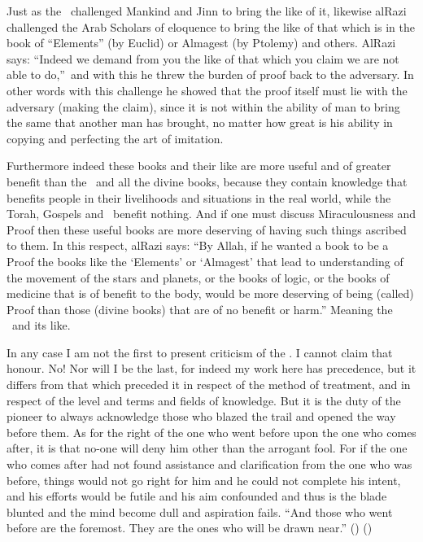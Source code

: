 \documentclass[12pt]{memoir}
\begin{document}
Just as the \Quran\ challenged Mankind and Jinn to bring the like of it,
likewise al\–Razi challenged the Arab Scholars of eloquence to bring
the like of that which is in the book of “Elements” (by Euclid)
or Almagest (by Ptolemy) and others.
Al\–Razi says: “Indeed we demand from you the like of that which you claim we
are not able to do,”\fnmark\
and with this he threw the burden of proof back to the adversary.
In other words with this challenge he showed that the proof itself must lie
with the adversary (making the claim), since it is not within the ability of
man to bring the same that another man has brought, no matter how great
is his ability in copying and perfecting the art of imitation.


Furthermore indeed these books and their like are more useful and of greater
benefit than the \Quran\ and all the divine books, because they contain
knowledge that benefits people in their livelihoods
and situations in the real world,
while the Torah, Gospels and \Quran\ benefit nothing.
And if one must discuss Miraculousness and Proof then these useful books
are more deserving of having such things ascribed to them.
In this respect, al\–Razi says: “By Allah, if he wanted a book to be a
Proof the books like the ‘Elements’ or ‘Almagest’ that lead to understanding
of the movement of the stars and planets, or the books of logic,
or the books of medicine that is of benefit to the body,
would be more deserving of being (called) Proof than those (divine books)
that are of no benefit or harm.”\fnmark\@
Meaning the \Quran\ and its like.


In any case I am not the first to present criticism of the \Quran.
I cannot claim that honour.
No! Nor will I be the last, for indeed my work here has precedence,
but it differs from that which preceded it in
respect of the method of treatment,
and in respect of the level and terms and fields of knowledge.
But it is the duty of the pioneer to always acknowledge those
who blazed the trail and opened the way before them.
As for the right of the one who went before upon the one who comes after,
it is that no-one will deny him other than the arrogant fool.
For if the one who comes after had not found assistance and
clarification from the one who was before,
things would not go right for him and he could not complete his intent,
and his efforts would be futile and his aim confounded and
thus is the blade blunted and the mind become dull and aspiration fails.
“And those who went before are the foremost.
They are the ones who will be drawn near.” ()
()
\end{document}
